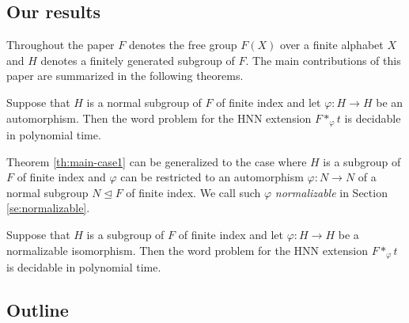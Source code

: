 \documentclass[12pt,oneside]{amsart}
\newtheorem*{theorem**}{Theorem\theoremnum}
\newenvironment{theorem*}[1][]{%
  \edef\theoremnum{\if\relax\detokenize{#1}\relax\else~#1\fi}%
  \begin{theorem**}
}{%
  \end{theorem**}
}
\theoremstyle{definition}
\theoremstyle{case}
\begin{document}

\subsection{Our results}
\label{se:Contribution}

Throughout the paper $F$ denotes the free group $F(X)$ over a finite alphabet $X$
and $H$ denotes a finitely generated subgroup of $F$. 
The main contributions of this paper are summarized in the following theorems.

\begin{theorem*}[\ref{th:main-case1}]
Suppose that $H$ is a normal subgroup of $F$ of finite index
and let $\varphi:H\to H$ be an automorphism.
Then the word problem for the HNN extension $F\ast_\varphi t$
is decidable in polynomial time.
\end{theorem*}

Theorem \ref{th:main-case1} can be generalized to the case
where $H$ is a subgroup of $F$ of finite index and 
$\varphi$ can be restricted to an automorphism $\varphi:N\to N$
of a normal subgroup $N\unlhd F$ of finite index.
We call such $\varphi$ \emph{normalizable} in Section \ref{se:normalizable}.

\begin{theorem*}[\ref{th:main-case2}]
\label{thm:NonNormalNiceIsomorphismCase}
Suppose that $H$ is a subgroup of $F$ of finite index 
and let $\varphi:H\to H$ be a normalizable isomorphism.
Then the word problem for the HNN extension $F\ast_\varphi t$
is decidable in polynomial time.
\end{theorem*}


\subsection{Outline}
\end{document}
